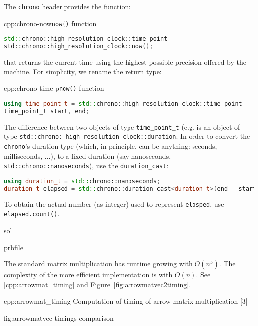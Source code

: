 \begin{samproblem}
\begin{subproblem}{}
  The \texttt{chrono} header provides the function:
  \begin{samcode}[C++11-code]{cpp:chrono-now}{\texttt{now()} function}
    \begin{lstlisting}[language=C++, style=cpp]
std::chrono::high_resolution_clock::time_point
std::chrono::high_resolution_clock::now();
    \end{lstlisting}
  \end{samcode}
that returns the current time using the highest possible precision offered by
the machine. For simplicity, we rename the return type:
\begin{samcode}[C++11-code]{cpp:chrono-time-p}{\texttt{now()} function}
\begin{lstlisting}[language=C++, style=cpp]
using time_point_t = std::chrono::high_resolution_clock::time_point
time_point_t start, end;
\end{lstlisting}
\end{samcode}
The difference between two objects of type \texttt{time\_point\_t}
(e.g.  is an
object of type \texttt{std::chrono::high\_resolution\_clock::duration}.
In order to convert the \texttt{chrono}'s duration type (which, in principle,
can be anything: seconds, milliseconds, ...), to a fixed duration (say
nanoseconds, \texttt{std::chrono::nanoseconds}), use the \texttt{duration\_cast}:
\begin{lstlisting}[language=C++, style=cpp]
using duration_t = std::chrono::nanoseconds;
duration_t elapsed = std::chrono::duration_cast<duration_t>(end - start);
\end{lstlisting}
To obtain the actual number (as integer) used to represent
\texttt{elasped}, use \texttt{elapsed.count()}.


\begin{samwriteprbpart}{sol}
    \begin{writeverbatim}{prbfile}
      \begin{samsolution}
        The standard matrix multiplication has runtime growing with $O(n^3)$.
        The complexity of the more efficient implementation is with $O(n)$.
        See \autoref{cpp:arrowmat_timing} and Figure~\ref{fig:arrowmatvec2timing}.

        \begin{samcode}[C++11-code]{cpp:arrowmat_timing}
          {Computation of timing of arrow matrix multiplication}
          [3]
        \end{samcode}

        {fig:arrowmatvec-timings-comparison}

      \end{samsolution}
    \end{writeverbatim}
  \end{samwriteprbpart}
\end{subproblem}

\end{samproblem}
